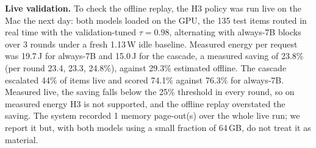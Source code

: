 \textbf{Live validation.} To check the offline replay, the H3 policy was run live on the Mac the next day: both models loaded on the GPU, the 135 test items routed in real time with the validation-tuned $\tau=0.98$, alternating with always-7B blocks over 3 rounds under a fresh 1.13\,W idle baseline. Measured energy per request was 19.7\,J for always-7B and 15.0\,J for the cascade, a measured saving of 23.8\% (per round 23.4, 23.3, 24.8\%), against 29.3\% estimated offline. The cascade escalated 44\% of items live and scored 74.1\% against 76.3\% for always-7B. Measured live, the saving falls below the 25\% threshold in every round, so on measured energy H3 is not supported, and the offline replay overstated the saving. The system recorded 1 memory page-out(s) over the whole live run; we report it but, with both models using a small fraction of 64\,GB, do not treat it as material.
